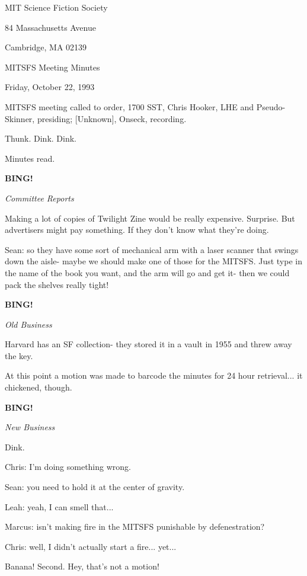 \documentclass[12pt]{article}
\newcommand{\bing}{{\bf BING!} }
\newcommand{\goto}[1]{\bing \vskip 12pt \centerline{{\em{#1}}}}
\begin{document}
\begin{center}

MIT Science Fiction Society 

84 Massachusetts Avenue

Cambridge, MA 02139

\vspace{12pt}

MITSFS Meeting Minutes 

Friday, October 22, 1993

\end{center}
 
\vspace{18pt}

\setlength{\parskip}{6pt}

\noindent
MITSFS meeting called to order, 1700 SST,
Chris Hooker, LHE and Pseudo-Skinner, presiding; [Unknown], Onseck, recording.

Thunk. Dink. Dink.

Minutes read.

\goto{Committee Reports}

Making a lot of copies of Twilight Zine would be really expensive. Surprise. But advertisers might pay something. If they don't know what they're doing.

Sean: so they have some sort of mechanical arm with a laser scanner that swings down the aisle- maybe we should make one of those for the MITSFS. Just type in the name of the book you want, and the arm will go and get it- then we could pack the shelves really tight!

\goto{Old Business}

Harvard has an SF collection- they stored it in a vault in 1955 and threw away the key.

At this point a motion was made to barcode the minutes for 24 hour retrieval... it chickened, though.

\goto{New Business}

Dink.

Chris: I'm doing something wrong.

Sean: you need to hold it at the center of gravity.

Leah: yeah, I can smell that...

Marcus: isn't making fire in the MITSFS punishable by defenestration?

Chris: well, I didn't actually start a fire... yet...

Banana! Second. Hey, that's not a motion!
\end{document}

